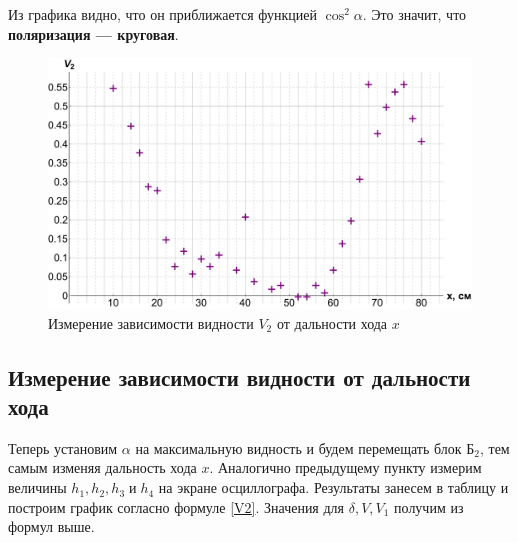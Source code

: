 \documentclass[12pt]{kiarticle} %
\begin{document}
Из графика видно, что он приближается функцией $ \cos^2 \alpha $. Это значит, что \textbf{поляризация --- круговая}.

	\begin{figure}[h]
	\label{graf_v2}
	\includegraphics[scale=0.47]{v2.pdf}
	\caption{Измерение зависимости видности $ V_2 $ от дальности хода $ x $}
\end{figure}

\subsection{Измерение зависимости видности от дальности хода}


Теперь установим $ \alpha $ на максимальную видность и будем перемещать блок $ Б_2 $, тем самым изменяя дальность хода $ x $. Аналогично предыдущему пункту измерим величины $ h_1, h_2, h_3 \; и \; h_4 $ на экране осциллографа. Результаты занесем в таблицу и построим график согласно формуле \eqref{V2}. Значения для $ \delta, V, V_1 $ получим из формул выше.
\end{document}
